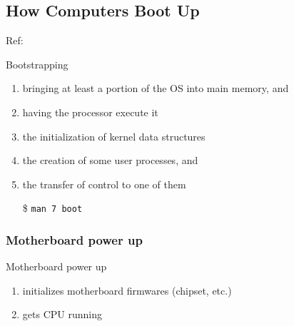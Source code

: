 \subsection{How Computers Boot Up}

Ref: 

\begin{frame}{Bootstrapping}
  \begin{center}
  \end{center}
  \begin{enumerate}
  \item bringing at least a portion of the OS into main memory, and
  \item having the processor execute it
  \item the initialization of kernel data structures
  \item the creation of some user processes, and
  \item the transfer of control to one of them
  \item[\$] \texttt{man 7 boot}
  \end{enumerate}
\end{frame}

\subsubsection{Motherboard power up}

\begin{frame}
  \begin{block}{Motherboard power up}
    \begin{enumerate}
    \item initializes motherboard firmwares (chipset, etc.)
    \item gets CPU running
    \end{enumerate}
  \end{block}
\end{frame}

